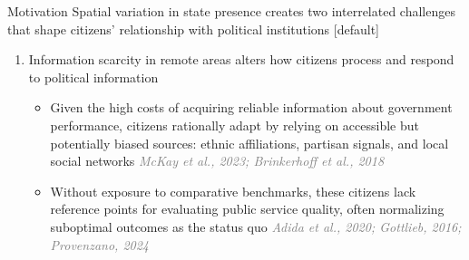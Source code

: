\documentclass[10pt]{beamer}
\begin{document}
\begin{frame}{Motivation}
        \centering Spatial variation in state presence creates two interrelated challenges that shape citizens’ relationship
        with political institutions\vfill   \pause
        \smallskip
        [default]

        \begin{enumerate}
            \item Information scarcity in remote areas alters how citizens process and respond to political information\vfil
            \begin{itemize}\setlength\itemsep{1em}
                \vspace{0.5em}
                \item Given the high costs of acquiring reliable information about government performance, citizens rationally adapt by relying
                on accessible but potentially biased sources: ethnic affiliations, partisan signals, and local
                social networks \textcolor{gray}{\textit{McKay et al., 2023; Brinkerhoff et al., 2018}}\vfill   \pause
                \item Without exposure to comparative benchmarks, these citizens lack reference points
                for evaluating public service quality, often normalizing suboptimal outcomes as the status
                quo \textcolor{gray}{\textit{Adida et al., 2020; Gottlieb, 2016; Provenzano, 2024}}\vfill
               \end{itemize}
            \end{enumerate}
        \end{frame}
\end{document}
